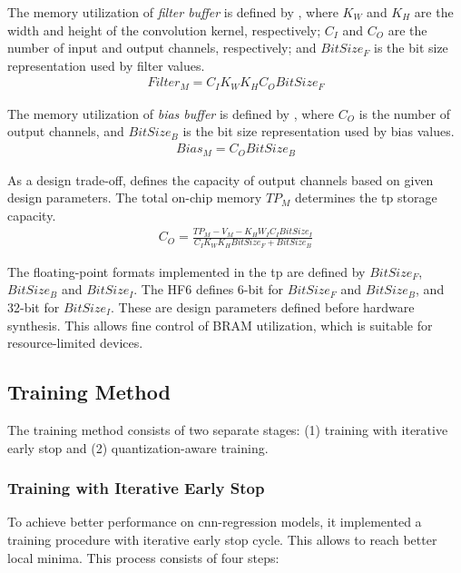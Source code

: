 The memory utilization of \emph{filter buffer} is defined by , where $K_{W}$ and $K_{H}$ are the width and height of the convolution kernel, respectively; $C_{I}$ and $C_{O}$ are the number of input and output channels, respectively; and $BitSize_{F}$ is the bit size representation used by filter values.
\begin{eqnarray} \label{eq:filter_memory}
Filter_{M}=C_{I}K_{W}K_{H}C_{O}BitSize_{F}
\end{eqnarray}

The memory utilization of \emph{bias buffer} is defined by , where $C_{O}$ is the number of output channels, and $BitSize_{B}$ is the bit size representation used by bias values.
\begin{eqnarray} \label{eq:bias_memory}
Bias_{M}=C_{O}BitSize_{B}
\end{eqnarray}

As a design trade-off,  defines the capacity of output channels based on given design parameters. The total on-chip memory $TP_{M}$ determines the \gls{tp} storage capacity.
\begin{eqnarray} \label{eq:channel_in_memory}
C_{O}=\frac{TP_{M}-V_{M}-K_{H}W_{I}C_{I}BitSize_{I}}{C_{I}K_{W}K_{H}BitSize_{F}+BitSize_{B}}
\end{eqnarray}

The floating-point formats implemented in the \gls{tp} are defined by $BitSize_F$, $BitSize_B$ and $BitSize_I$. The HF6 defines 6-bit for $BitSize_F$ and $BitSize_B$, and 32-bit for $BitSize_I$. These are design parameters defined before hardware synthesis. This allows fine control of BRAM utilization, which is suitable for resource-limited devices.

\subsection{Training Method}
The training method consists of two separate stages: (1) training with iterative early stop and (2) quantization-aware training.
 
\subsubsection{Training with Iterative Early Stop}
To achieve better performance on \gls{cnn}-regression models, it implemented a training procedure with iterative early stop cycle. This allows to reach better local minima. This process consists of four steps:

